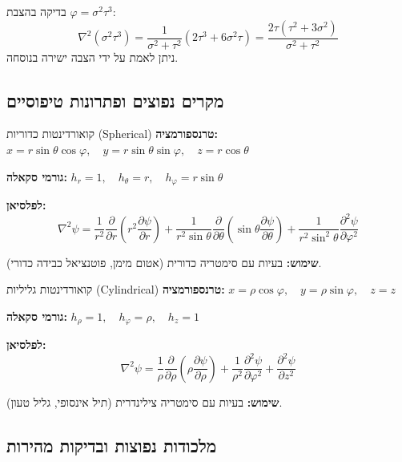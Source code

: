 \documentclass{article}
\begin{document}
\begin{notebox}{בדיקה}
בהצבת $\varphi = \sigma^2\tau^3$:
\[
\nabla^2(\sigma^2\tau^3) = \frac{1}{\sigma^2+\tau^2}(2\tau^3 + 6\sigma^2\tau) = \frac{2\tau(\tau^2 + 3\sigma^2)}{\sigma^2+\tau^2}
\]
ניתן לאמת על ידי הצבה ישירה בנוסחה.
\end{notebox}

\subsection*{מקרים נפוצים ופתרונות טיפוסיים}

\begin{mainbox}{קואורדינטות כדוריות (Spherical)}
\textbf{טרנספורמציה:}
$x = r\sin\theta\cos\varphi, \quad y = r\sin\theta\sin\varphi, \quad z = r\cos\theta$

\textbf{גורמי סקאלה:}
$h_r = 1, \quad h_\theta = r, \quad h_\varphi = r\sin\theta$

\textbf{לפלסיאן:}
\[
\nabla^2\psi = \frac{1}{r^2}\frac{\partial}{\partial r}\left(r^2\frac{\partial\psi}{\partial r}\right) + \frac{1}{r^2\sin\theta}\frac{\partial}{\partial\theta}\left(\sin\theta\frac{\partial\psi}{\partial\theta}\right) + \frac{1}{r^2\sin^2\theta}\frac{\partial^2\psi}{\partial\varphi^2}
\]

\textbf{שימוש:} בעיות עם סימטריה כדורית (אטום מימן, פוטנציאל כבידה כדורי).
\end{mainbox}

\begin{mainbox}{קואורדינטות גליליות (Cylindrical)}
\textbf{טרנספורמציה:}
$x = \rho\cos\varphi, \quad y = \rho\sin\varphi, \quad z = z$

\textbf{גורמי סקאלה:}
$h_\rho = 1, \quad h_\varphi = \rho, \quad h_z = 1$

\textbf{לפלסיאן:}
\[
\nabla^2\psi = \frac{1}{\rho}\frac{\partial}{\partial\rho}\left(\rho\frac{\partial\psi}{\partial\rho}\right) + \frac{1}{\rho^2}\frac{\partial^2\psi}{\partial\varphi^2} + \frac{\partial^2\psi}{\partial z^2}
\]

\textbf{שימוש:} בעיות עם סימטריה צילינדרית (תיל אינסופי, גליל טעון).
\end{mainbox}

\subsection*{מלכודות נפוצות ובדיקות מהירות}
\end{document}
